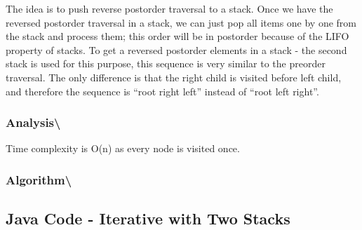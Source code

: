 \documentclass[]{book}
\begin{document}
The idea is to push reverse postorder traversal to a stack. Once we have the reversed postorder traversal in
a stack, we can just pop all items one by one from the stack and process them; this order will be in
postorder because of the LIFO property of stacks. To get a reversed postorder elements in a stack -
the second stack is used for this purpose, this sequence is very similar to the preorder traversal. The only
difference is that the right child is visited before left child, and therefore the sequence is
``root right left'' instead of ``root left right''.

\hypertarget{analysis-79}{%
\subsubsection{Analysis\textbackslash{}}\label{analysis-79}}

Time complexity is O(n) as every node is visited once.

\hypertarget{algorithm-80}{%
\subsubsection{Algorithm\textbackslash{}}\label{algorithm-80}}

\hypertarget{java-code---iterative-with-two-stacks}{%
\subsection{Java Code - Iterative with Two Stacks}\label{java-code---iterative-with-two-stacks}}
\end{document}
